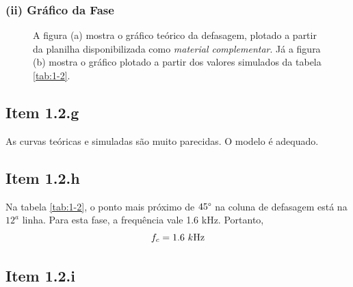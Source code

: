 \documentclass[11pt]{article}
\begin{document}
\subsubsection*{(ii) Gráfico da Fase}

\begin{figure}[h!]
  \centering
  \qquad
  \caption{A figura (a) mostra o gráfico teórico da defasagem, plotado a partir da planilha disponibilizada como \emph{material complementar}. Já a figura (b) mostra o gráfico plotado a partir dos valores simulados da tabela \ref{tab:1-2}.}
\end{figure}

\subsection*{Item 1.2.g}

As curvas teóricas e simuladas são muito parecidas. O modelo é adequado.

\subsection*{Item 1.2.h}

Na tabela \ref{tab:1-2}, o ponto mais próximo de $45\degree$ na coluna de defasagem está na $12^{a}$ linha. Para esta fase, a frequência vale 1.6 kHz. Portanto,
$$
  f_{c} = 1.6\ k\textnormal{Hz}
$$

\subsection*{Item 1.2.i}
\end{document}
